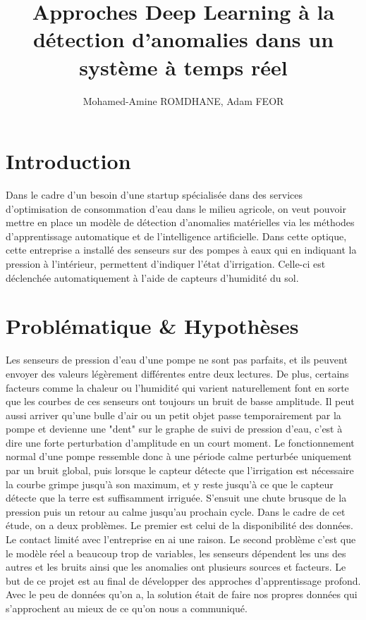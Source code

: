 \documentclass[french]{article}
\title{Approches Deep Learning à la détection d'anomalies dans un système à temps réel}
\author{Mohamed-Amine ROMDHANE, Adam FEOR}
\date{}
\theoremstyle{mytheoremstyle}
\theoremstyle{mytheoremstyle}
\theoremstyle{myproblemstyle}
\begin{document}
    \maketitle

    \tableofcontents
    \clearpage

    \section{Introduction}
    Dans le cadre d'un besoin d'une startup spécialisée dans des services d'optimisation de consommation d'eau dans le milieu agricole, on veut pouvoir mettre en place un modèle de détection d'anomalies matérielles via les méthodes d'apprentissage automatique et de l'intelligence artificielle. Dans cette optique, cette entreprise a installé des senseurs sur des pompes à eaux qui en indiquant la pression à l'intérieur, permettent d'indiquer l'état d'irrigation. Celle-ci est déclenchée automatiquement à l'aide de capteurs d'humidité du sol.     
    \section{Problématique \& Hypothèses}
    Les senseurs de pression d'eau d'une pompe ne sont pas parfaits, et ils peuvent envoyer des valeurs légèrement différentes entre deux lectures. De plus, certains facteurs comme la chaleur ou l'humidité qui varient naturellement font en sorte que les courbes de ces senseurs ont toujours un bruit de basse amplitude. Il peut aussi arriver qu'une bulle d'air ou un petit objet passe temporairement par la pompe et devienne une "dent" sur le graphe de suivi de pression d'eau, c'est à dire une forte perturbation d'amplitude en un court moment.
    \newline
    \indent Le fonctionnement normal d'une pompe ressemble donc à une période calme perturbée uniquement par un bruit global, puis lorsque le capteur détecte que l'irrigation est nécessaire la courbe grimpe jusqu'à son maximum, et y reste jusqu'à ce que le capteur détecte que la terre est suffisamment irriguée. S'ensuit une chute brusque de la pression puis un retour au calme jusqu'au prochain cycle.
    \newline
    \indent Dans le cadre de cet étude, on a deux problèmes. Le premier est celui de la disponibilité des données. Le contact limité avec l'entreprise en ai une raison. Le second problème c'est que le modèle réel a beaucoup trop de variables, les senseurs dépendent les uns des autres et les bruits ainsi que les anomalies ont plusieurs sources et facteurs. 
    \newline
    \indent Le but de ce projet est au final de développer des approches d'apprentissage profond. Avec le peu de données qu'on a, la solution était de faire nos propres données qui s'approchent au mieux de ce qu'on nous a communiqué.
\end{document}
